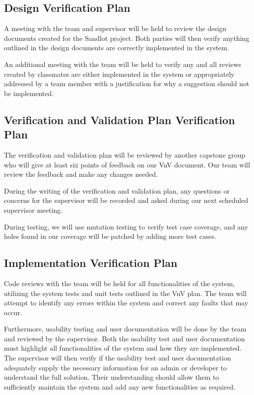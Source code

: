 \documentclass[12pt, titlepage]{article}
\begin{document}
\subsection{Design Verification Plan}

A meeting with the team and supervisor will be held to review the design documents created
for the Sandlot project. Both parties will then verify anything outlined in the design
documents are correctly implemented in the system.

An additional meeting with the team will be held to verify any and all reviews created by
classmates are either implemented in the system or appropriately addressed by a team member
with a justification for why a suggestion should not be implemented.

\subsection{Verification and Validation Plan Verification Plan}

The verification and validation plan will be reviewed by another capstone
group who will give at least six points of feedback on our VnV document. Our
team will review the feedback and make any changes needed. 

During the writing of the verification and validation plan, any questions or
concerns for the supervisor will be recorded and asked during our next
scheduled supervisor meeting.

During testing, we will use mutation testing to verify test case coverage, and
any holes found in our coverage will be patched by adding more test cases.

\subsection{Implementation Verification Plan}

Code reviews with the team will be held for all functionalities of the system, utilizing the
system tests and unit tests outlined in the VnV plan. The team will attempt to identify any
errors within the system and correct any faults that may occur.

Furthermore, usability testing and user documentation will be done by the team and
reviewed by the supervisor. Both the usability test and user documentation must highlight
all functionalities of the system and how they are implemented. The supervisor will then
verify if the usability test and user documentation adequately supply the necessary
information for an admin or developer to understand the full solution. Their understanding
should allow them to sufficiently maintain the system and add any new functionalities as
required.
\end{document}
